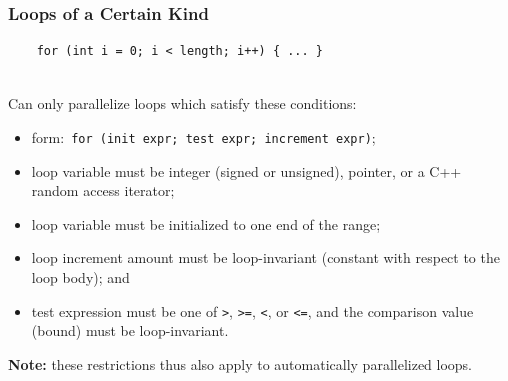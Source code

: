 \begin{frame}[fragile]
  \frametitle{Loops of a Certain Kind}

  
\begin{verbatim}
    for (int i = 0; i < length; i++) { ... }
\end{verbatim}~\\[1em]

    Can only parallelize loops which satisfy these conditions:
\begin{itemize}
\item form:~{\tt for (init expr; test expr; increment expr)};
\item loop variable must be integer (signed or unsigned), pointer, or a C++
random access iterator;
\item loop variable must be initialized to one end of the range;
\item loop increment amount must be loop-invariant (constant with respect to the loop body); and
\item test expression must be one of {\tt >}, {\tt >=}, {\tt <}, or {\tt <=}, and the comparison value (bound) must be loop-invariant.
\end{itemize}

{\bf Note:} these restrictions thus also apply to automatically parallelized
loops.


\end{frame}

